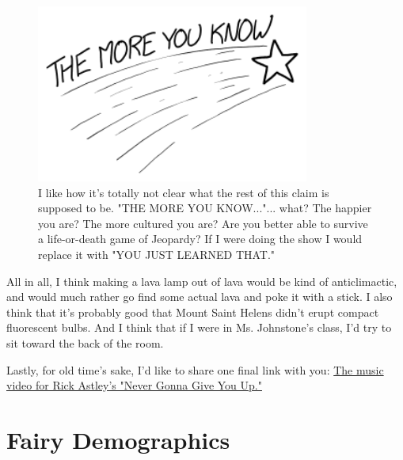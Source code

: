 {\begin{figure}[!htbp]
\centering
\includegraphics[scale=0.5, max width=0.8\textwidth]{imgs/a/122/more.png}
\caption{I like how it's totally not clear what the rest of this claim is supposed to be. "THE MORE YOU KNOW..."... what? The happier you are? The more cultured you are? Are you better able to survive a life-or-death game of Jeopardy? If I were doing the show I would replace it with "YOU JUST LEARNED THAT."}
\end{figure}

{All in all, I think making a lava lamp out of lava would be kind of anticlimactic, and would much rather go find some actual lava and poke it with a stick. I also think that it's probably good that Mount Saint Helens didn't erupt compact fluorescent bulbs. And I think that if I were in Ms. Johnstone's class, I'd try to sit toward the back of the room.}

{Lastly, for old time's sake, I'd like to share one final link with you: \href{https://www.youtube.com/watch?v=Q8NXO6YxBmU\#t=3}{The music video for Rick Astley's "Never Gonna Give You Up."}}

{
\chapter{Fairy Demographics}
}

}
